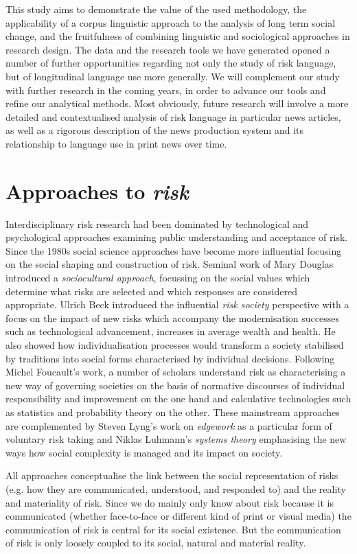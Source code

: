 \documentclass{report}
\begin{document}
This study aims to demonstrate the value of the used methodology, the applicability of a corpus linguistic approach to the analysis of long term social change, and the fruitfulness of combining linguistic and sociological approaches in research design. The data and the research tools we have generated opened a number of further opportunities regarding not only the study of risk language, but of longitudinal language use more generally. We will complement our study with further research in the coming years, in order to advance our tools and refine our analytical methods. Most obviously, future research will involve a more detailed and contextualised analysis of risk language in particular news articles, as well as a rigorous description of the news production system and its relationship to language use in print news over time.

\section{Approaches to \emph{risk}}

Interdisciplinary risk research had been dominated by technological and psychological approaches examining public understanding and acceptance of risk. Since the 1980s social science approaches have become more influential focusing on the social shaping and construction of risk. Seminal work of Mary Douglas introduced a \emph{sociocultural approach}, focussing on the social values which  determine what risks are selected and which responses are considered appropriate. Ulrich Beck introduced the influential \emph{risk society} perspective with a focus on the impact of new risks which accompany the modernisation successes such as technological advancement, increases in average wealth and health. He also showed how individualisation processes would transform a society stabilised by traditions into social forms characterised by individual decisions. Following Michel Foucault's work, a number of scholars understand risk as characterising a new way of governing societies on the basis of normative discourses of individual responsibility and improvement on the one hand and calculative technologies such as statistics and probability theory on the other. These mainstream approaches are complemented by Steven Lyng's work on \emph{edgework} as a particular form of voluntary risk taking and Niklas Luhmann's \emph{systems theory} emphasising the new ways how social complexity is managed and its impact on society.

All approaches conceptualise the link between the social representation of risks (e.g. how they are communicated, understood, and responded to) and the reality and materiality of risk. Since we do mainly only know about risk because it is communicated (whether face-to-face or different kind of print or visual media) the communication of risk is central for its social existence. But the communication of risk is only loosely coupled to its social, natural and material reality.
\end{document}
